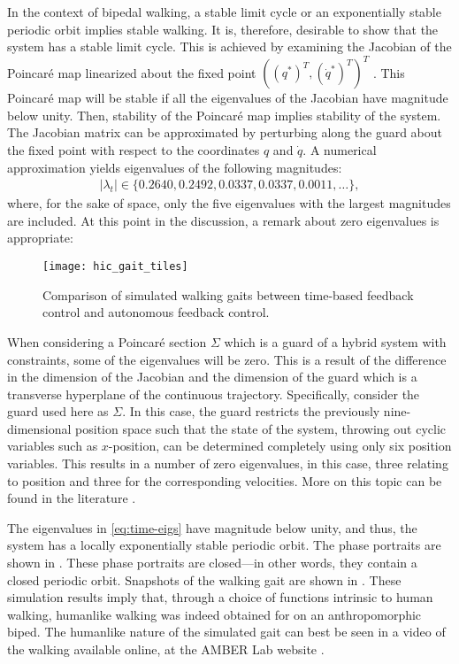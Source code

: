 In the context of bipedal walking, a stable limit cycle or an exponentially
stable periodic orbit implies stable walking. It is, therefore, desirable to
show that the system has a stable limit cycle. This is achieved by examining the
Jacobian of the Poincar{\'e} map linearized about the fixed point $((q^*)^T,
({\dot q}^*)^T)^T$ \cite{Parker1989}. This Poincar{\'e} map will be stable if
all the eigenvalues of the Jacobian have magnitude below unity. Then, stability
of the Poincar{\'e} map implies stability of the system. The Jacobian matrix can
be approximated by perturbing along the guard about the fixed point with respect
to the coordinates $q$ and ${\dot q}$. A numerical approximation yields
eigenvalues of the following magnitudes:
\begin{align}
  \label{eq:time-eigs}
  |\lambda_t| \in \{0.2640, 0.2492, 0.0337, 0.0337, 0.0011, \ldots\},
\end{align}
where, for the sake of space, only the five eigenvalues with the largest magnitudes are included. At this point in the discussion, a remark about zero eigenvalues is appropriate:


\begin{figure*}[p!]
  \centering
  \texttt{[image: hic\_gait\_tiles]}
  \caption{Comparison of simulated walking gaits between time-based feedback control and autonomous feedback control.}
  \label{fig:gaittiles}
\end{figure*}

\begin{remark}
  When considering a Poincar{\'e} section $\Sigma$ which is a guard of a hybrid
  system with constraints, some of the eigenvalues will be zero. This is a
  result of the difference in the dimension of the Jacobian and the dimension of
  the guard which is a transverse hyperplane of the continuous
  trajectory. Specifically, consider the guard used here as $\Sigma$. In this
  case, the guard restricts the previously nine-dimensional position space such
  that the state of the system, throwing out cyclic variables such as
  $x$-position, can be determined completely using only six position
  variables. This results in a number of zero eigenvalues, in this case, three
  relating to position and three for the corresponding velocities. More on this
  topic can be found in the literature \cite{Wendel2010}.
\end{remark}

The eigenvalues in \eqref{eq:time-eigs} have magnitude below unity, and thus,
the system has a locally exponentially stable periodic orbit. The phase
portraits are shown in . These phase portraits are closed---in
other words, they contain a closed periodic orbit. Snapshots of the walking gait
are shown in . These simulation results imply that,
through a choice of functions intrinsic to human walking, humanlike walking was
indeed obtained for on an anthropomorphic biped. The humanlike nature of the
simulated gait can best be seen in a video of the walking available online, at
the AMBER Lab website \cite{url:bipedalrobotics}.

